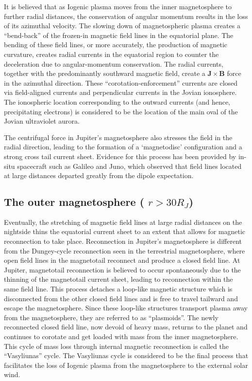 It is believed that as Iogenic plasma moves from the inner magnetosphere to further radial distances, the conservation of angular momentum results in the loss of its azimuthal velocity. The slowing down of magnetospheric plasma creates a ``bend-back'' of the frozen-in magnetic field lines in the equatorial plane. The bending of these field lines, or more accurately, the production of magnetic curvature, creates radial currents in the equatorial region to counter the deceleration due to angular-momentum conservation. The radial currents, together with the predominantly southward magnetic field, create a $\mathbf{J}\times\mathbf{B}$ force in the azimuthal direction. These ``corotation-enforcement'' currents are closed via field-aligned currents and perpendicular currents in the Jovian ionosphere. The ionospheric location corresponding to the outward currents (and hence, precipitating electrons) is considered to be the location of the main oval of the Jovian ultraviolet aurora.

The centrifugal force in Jupiter's magnetosphere also stresses the field in the radial direction, leading to the formation of a `magnetodisc' configuration and a strong cross tail current sheet. Evidence for this process has been provided by in-situ spacecraft such as Galileo and Juno, which observed that field lines located at large distances departed greatly from the dipole expectation. 

\subsection{The outer magnetosphere ( \texorpdfstring{$r > 30 R_J$)}{r>30}}
Eventually, the stretching of magnetic field lines at large radial distances on the nightside thins the equatorial current sheet to an extent that allows for magnetic reconnection to take place. Reconnection in Jupiter's magnetosphere is different from the Dungey-cycle reconnection seen in the terrestrial magnetosphere, where open field lines in the magnetotail reconnect and produce a closed field line. At Jupiter, magnetotail reconnection is believed to occur spontaneously due to the thinning of the magnetotail current sheet, leading to reconnection within the same field line. This process detaches a loop-like magnetic structure which is disconnected from the other closed field lines and is free to travel tailward and escape the magnetosphere. Since these loop-like structures transport plasma away from the magnetosphere, they are referred to as ``plasmoids''. The newly reconnected closed field line, now devoid of heavy mass, returns to the planet and continues to corotate and get loaded with mass from the inner magnetosphere. This cycle of mass loss through internal magnetic reconnection is called the ``Vasyliunas'' cycle. The Vasyliunas cycle is considered to be the final process that facilitates the loss of Iogenic plasma from the magnetosphere to the external solar wind.

